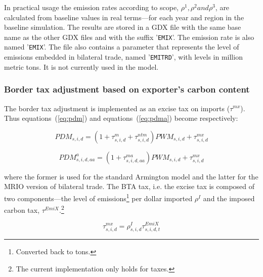 \documentclass[11pt,letterpaper]{report}
\begin{document}


In practical usage the emission rates according to scope, $\rho^1, \rho^2 and \rho^3$, are calculated from baseline values in real terms---for
each year and region in the baseline simulation. The results are stored in a GDX file with the
same base name as the other GDX files and with the suffix '\texttt{EMIX}'. The emission
rate is also named '\texttt{EMIX}'. The file
also contains a parameter that represents the level of emissions embedded in bilateral
trade, named '\texttt{EMITRD}', with levels in million metric tons.
It is not currently used in the model.

\subsubsection{Border tax adjustment based on exporter's carbon content}

The border tax adjustment is implemented as
an excise tax on imports ($\tau^\mathit{mx}$).
Thus equations~(\ref{eq:pdm}) and equations~(\ref{eq:pdma})  become respectively:

\begin{equation}
\label{eq:pdmx}
\mathit{PDM}_{s,i,d} = \left( 1 + \tau^m_{s,i,d}  + \tau^{\mathit{ntm}}_{s,i,d} \right) \mathit{PWM}_{s,i,d}
+ \tau^\mathit{mx}_{s,i,d}
\end{equation}

\begin{equation}
\label{eq:pdmax}
\mathit{PDM}^a_{s,i,d,\mathit{aa}} =
   \left( 1 + \tau^\mathit{ma}_{s,i,d,\mathit{aa}} \right) \mathit{PWM}_{s,i,d} + \tau^\mathit{mx}_{s,i,d}
\end{equation}

\noindent where the former is used for the standard Armington model and the latter
for the MRIO version of bilateral trade. The BTA tax, i.e. the excise
tax is composed of two components---the
level of \COT{} emissions\footnote{Converted back to tons.} per dollar imported $\rho^\mathit{I}$ and
the imposed carbon tax, $\tau^{\mathit{EmiX}}$.\footnote{The current implementation only holds for \COT{}
taxes.}

\begin{equation}
\label{eq:taumx}
\tau^\mathit{mx}_{s,i,d} = \rho^\mathit{I}_{s,i,d}
\tau^{\mathit{EmiX}}_{s,i,d,t}
\end{equation}
\end{document}
